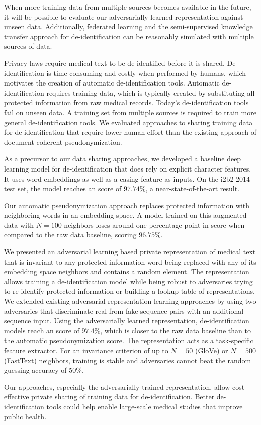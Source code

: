 %
When more training data from multiple sources becomes available in the future, it will be possible to evaluate our adversarially learned representation against unseen data.
%
Additionally, federated learning and the semi-supervised knowledge transfer approach for de-identification can be reasonably simulated with multiple sources of data.


%
Privacy laws require medical text to be de-identified before it is shared.
%
De-identifi\-ca\-tion is time-consuming and costly when performed by humans, which motivates the creation of automatic de-identification tools.
%
Automatic de-identification requires training data, which is typically created by substituting all protected information from raw medical records.
%
Today's de-identification tools fail on unseen data.
%
A training set from multiple sources is required to train more general de-identification tools.
%
We evaluated approaches to sharing training data for de-identification that require lower human effort than the existing approach of document-coherent pseudonymization.

%
As a precursor to our data sharing approaches, we developed a baseline deep learning model for de-identification that does rely on explicit character features.
%
It uses word embeddings as well as a casing feature as inputs.
%
On the i2b2 2014 test set, the model reaches an \fone score of $97.74\%$, a near-state-of-the-art result.

%
Our automatic pseudonymization approach replaces protected information with neighboring words in an embedding space.
%
A model trained on this augmented data with $N=100$ neighbors loses around one percentage point in \fone score when compared to the raw data baseline, scoring $96.75\%$.

%
We presented an adversarial learning based private representation of medical text that is invariant to any protected information word being replaced with any of its embedding space neighbors and contains a random element.
%
The representation allows training a de-identification model while being robust to adversaries trying to re-identify protected information or building a lookup table of representations.
%
We extended existing adversarial representation learning approaches by using two adversaries that discriminate real from fake sequence pairs with an additional sequence input.
%
Using the adversarially learned representation, de-identification models reach an \fone score of $97.4\%$, which is closer to the raw data baseline than to the automatic pseudonymization score.
%
The representation acts as a task-specific feature extractor.
%
For an invariance criterion of up to $N=50$ (GloVe) or $N=500$ (FastText) neighbors, training is stable and adversaries cannot beat the random guessing accuracy of $50\%$.

%
Our approaches, especially the adversarially trained representation, allow cost-effective private sharing of training data for de-identification.
%
Better de-identification tools could help enable large-scale medical studies that improve public health.
